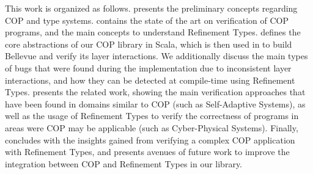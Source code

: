 This work is organized as follows.  presents the preliminary concepts regarding 
\ac{COP} and type systems.  contains the state of the art on verification of 
\ac{COP} programs, and the main concepts to understand Refinement Types.  
defines the core abstractions of our \ac{COP} library in Scala, which is then used in 
 to build Bellevue and verify its layer interactions. We additionally discuss the main 
types of bugs that were found during the implementation due to inconsistent layer interactions, and how 
they can be detected at compile-time using Refinement Types.  presents the 
related work, showing the main verification approaches that have been found in domains similar to 
\ac{COP} (such as Self-Adaptive Systems), as well as the usage of Refinement Types to verify the 
correctness of programs in areas were \ac{COP} may be applicable (such as Cyber-Physical Systems).
Finally,  concludes with the insights gained from verifying a complex \ac{COP} 
application with Refinement Types, and presents avenues of future work to improve the integration 
between \ac{COP} and Refinement Types in our library.


\endinput

That is, that all functionality associated with a context is available to complete execution of the adaptation. 

